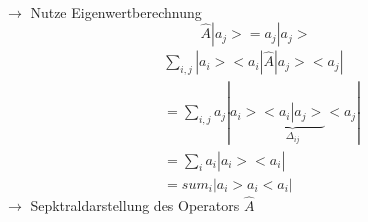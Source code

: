 \documentclass[10pt,article,colorback,accentcolor=tud9d]{scrartcl}
\begin{document}
\begin{fleqn}
\begin{itemize}
\begin{equation}
\begin{aligned}
    \end{aligned}
    \end{equation}
    $\rightarrow$ Nutze Eigenwertberechnung
    \begin{equation}
    \hat{A}\left.\right|a_j>=a_j\left.\right|a_j>
    \end{equation}
    \begin{equation}
    \begin{aligned}
    &\sum_{i,j}\left.\right|a_i><a_i\left.\right|\hat{A}\left.\right|a_j><a_j\left.\right|\\
    &=\sum_{i,j}a_j\left.\right|a_i>\underbrace{<a_i\left.\right|a_j>}_{\Delta_{ij}}<a_j\left.\right|\\
    &=\sum_ia_i\left.\right|a_i><a_i\left.\right|\\
    &=sum_i\left.\right|a_i>a_i<a_i\left.\right|
    \end{aligned}
    \end{equation}
    $\rightarrow$ Sepktraldarstellung des Operators $\hat{A}$
  
\end{itemize}





\end{fleqn}
\end{document}
